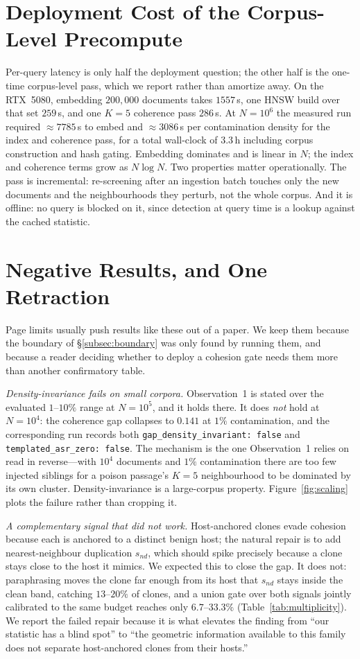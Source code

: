 \documentclass[10pt,journal,compsoc]{IEEEtran}
\begin{document}
\section{Deployment Cost of the Corpus-Level Precompute}
\label{app:cost}
Per-query latency is only half the deployment question; the other half is the one-time
corpus-level pass, which we report rather than amortize away. On the RTX~5080, embedding
$200{,}000$ documents takes $1557$\,s, one HNSW build over that set $259$\,s, and one $K=5$
coherence pass $286$\,s. At $N=10^6$ the measured run required $\approx 7785$\,s to embed and
$\approx 3086$\,s per contamination density for the index and coherence pass, for a total
wall-clock of $3.3$\,h including corpus construction and hash gating. Embedding dominates and is
linear in $N$; the index and coherence terms grow as $N\log N$. Two properties matter
operationally. The pass is incremental: re-screening after an ingestion batch touches only the
new documents and the neighbourhoods they perturb, not the whole corpus. And it is offline: no
query is blocked on it, since detection at query time is a lookup against the cached statistic.

\section{Negative Results, and One Retraction}
\label{app:negative}
Page limits usually push results like these out of a paper. We keep them because the boundary of
\S\ref{subsec:boundary} was only found by running them, and because a reader deciding whether to
deploy a cohesion gate needs them more than another confirmatory table.

\emph{Density-invariance fails on small corpora.} Observation~1 is stated over the evaluated
$1$--$10\%$ range at $N=10^5$, and it holds there. It does \emph{not} hold at $N=10^4$: the
coherence gap collapses to $0.141$ at $1\%$ contamination, and the corresponding run records both
\texttt{gap\_density\_invariant: false} and \texttt{templated\_asr\_zero: false}. The mechanism is
the one Observation~1 relies on read in reverse---with $10^4$ documents and $1\%$ contamination
there are too few injected siblings for a poison passage's $K=5$ neighbourhood to be dominated by
its own cluster. Density-invariance is a large-corpus property. Figure~\ref{fig:scaling} plots
the failure rather than cropping it.

\emph{A complementary signal that did not work.} Host-anchored clones evade cohesion because each
is anchored to a distinct benign host; the natural repair is to add nearest-neighbour duplication
$s_{nd}$, which should spike precisely because a clone stays close to the host it mimics. We
expected this to close the gap. It does not: paraphrasing moves the clone far enough from its
host that $s_{nd}$ stays inside the clean band, catching $13$--$20\%$ of clones, and a union gate
over both signals jointly calibrated to the same budget reaches only $6.7$--$33.3\%$
(Table~\ref{tab:multiplicity}). We report the failed repair because it is what elevates the
finding from ``our statistic has a blind spot'' to ``the geometric information available to this
family does not separate host-anchored clones from their hosts.''
\end{document}
